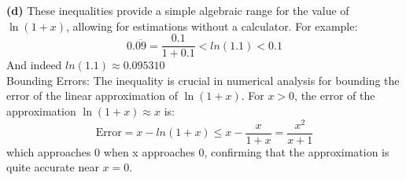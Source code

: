 \textbf{(d)}
These inequalities provide a simple algebraic range for the value of $\ln(1+x)$, allowing for estimations without a calculator. For example:\\
$$0.\overline{09}=\frac{0.1}{1+0.1}<ln(1.1)<0.1$$
And indeed $ln(1.1)\approx0.095310$
\\
Bounding Errors: The inequality is crucial in numerical analysis for bounding the error of the linear approximation of $\ln(1+x)$. For $x > 0$, the error of the approximation $\ln(1+x) \approx x$ is:
$$\text{Error} = x-ln(1+x)\le x-\frac{x}{1+x}=\frac{x^2}{x+1}$$
which approaches 0 when x approaches 0, confirming that the approximation is quite accurate near $x=0$.
\pagebreak
